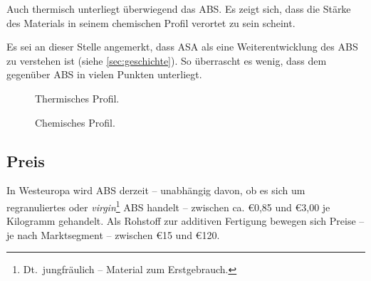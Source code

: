             Auch thermisch unterliegt überwiegend das ABS\@. Es zeigt sich, dass die Stärke des Materials in seinem chemischen
            Profil verortet zu sein scheint.

            Es sei an dieser Stelle angemerkt, dass ASA als eine Weiterentwicklung des ABS zu verstehen ist (siehe \cref{sec:geschichte}).
            So überrascht es wenig, dass dem gegenüber ABS in vielen Punkten unterliegt.
            \begin{figure}[H]
                \centering
                
                \caption{Thermisches Profil.}%
                \label{fig:pc thermal profile}
            \end{figure}
            \begin{figure}[H]
                \centering
                
                \caption{Chemisches Profil.}%
                \label{fig:pc chemical profile}
            \end{figure}
            \newpage
            \nocite{datenblattsammlung.KERN.20210201}
        \subsection{Preis}
            In Westeuropa wird ABS derzeit – unabhängig davon, ob es sich um regranuliertes oder \textit{virgin}\footnote{Dt.\ jungfräulich – Material zum Erstgebrauch.}
            ABS handelt – zwischen ca. €0,85 und €3,00 je Kilogramm gehandelt\cite{rohstoffboerse.kunststoffweb.de.20210206}.
            Als Rohstoff zur additiven Fertigung bewegen sich Preise – je nach Marktsegment – zwischen €15 und €120.

